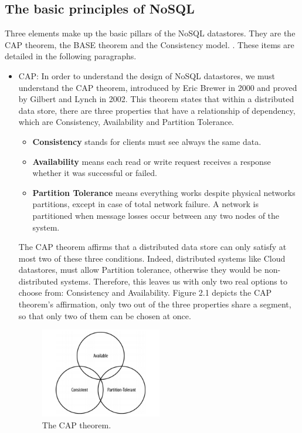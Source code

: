 \subsection{The basic principles of NoSQL}
Three elements make up the basic pillars of the NoSQL datastores. They are the CAP theorem, the BASE theorem and the Consistency model. \cite{wang2012nosql}. These items are detailed in the following paragraphs.
\par
\begin{itemize}

\item CAP:
 In order to understand the design of NoSQL datastores, we must understand  the CAP theorem, introduced by Eric Brewer in 2000 \cite{CAP} and proved by Gilbert and Lynch \cite{ProbeCAP} in 2002. This theorem states that within a distributed data store, there are three properties that have a relationship of dependency, which are Consistency, Availability and Partition Tolerance.
\begin{itemize}
\item \textbf{Consistency} stands for clients must see always the same data.
\item \textbf{Availability} means each read or write request receives a response whether it was successful or failed.
\item \textbf{Partition Tolerance} means everything works despite physical networks partitions, except in case of total network failure. A network is partitioned when message losses occur between any two nodes of the system.
\end{itemize}

The CAP theorem affirms that a distributed data store can only satisfy at most two of these three conditions. Indeed, distributed systems like Cloud datastores, must allow Partition tolerance, otherwise they would be non-distributed systems. Therefore, this leaves us with only two real options to choose from: Consistency and Availability. Figure 2.1 depicts the CAP theorem's affirmation, only two out of the three properties share a segment, so that only two of them can be chosen at once.

\begin{figure}[htb]
\centering
\includegraphics[width=0.5\textwidth]{./images/CAP.png}
\caption{The CAP theorem.} \label{fig:CAP}
\end{figure}


\end{itemize}
